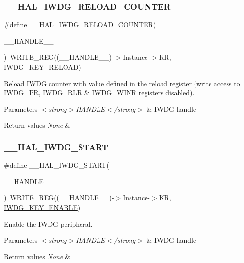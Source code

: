 \subsubsection{\texorpdfstring{\+\_\+\+\_\+\+H\+A\+L\+\_\+\+I\+W\+D\+G\+\_\+\+R\+E\+L\+O\+A\+D\+\_\+\+C\+O\+U\+N\+T\+ER}{\_\_HAL\_IWDG\_RELOAD\_COUNTER}}
{\footnotesize\ttfamily \#define \+\_\+\+\_\+\+H\+A\+L\+\_\+\+I\+W\+D\+G\+\_\+\+R\+E\+L\+O\+A\+D\+\_\+\+C\+O\+U\+N\+T\+ER(\begin{DoxyParamCaption}\item[{}]{\+\_\+\+\_\+\+H\+A\+N\+D\+L\+E\+\_\+\+\_\+ }\end{DoxyParamCaption})~W\+R\+I\+T\+E\+\_\+\+R\+EG((\+\_\+\+\_\+\+H\+A\+N\+D\+L\+E\+\_\+\+\_\+)-\/$>$Instance-\/$>$KR, \hyperlink{group___i_w_d_g___private___constants_ga33abf7b7c76dfda6b6380448a1d28966}{I\+W\+D\+G\+\_\+\+K\+E\+Y\+\_\+\+R\+E\+L\+O\+AD})}



Reload I\+W\+DG counter with value defined in the reload register (write access to I\+W\+D\+G\+\_\+\+PR, I\+W\+D\+G\+\_\+\+R\+LR \& I\+W\+D\+G\+\_\+\+W\+I\+NR registers disabled). 


\begin{DoxyParams}{Parameters}
{\em $<$strong$>$\+H\+A\+N\+D\+L\+E$<$/strong$>$} & I\+W\+DG handle \\
\hline
\end{DoxyParams}

\begin{DoxyRetVals}{Return values}
{\em None} & \\
\hline
\end{DoxyRetVals}
\mbox{\label{group___i_w_d_g___exported___macros_ga5914aff5b85e3151bb75377a32d83d6a}} 
\subsubsection{\texorpdfstring{\+\_\+\+\_\+\+H\+A\+L\+\_\+\+I\+W\+D\+G\+\_\+\+S\+T\+A\+RT}{\_\_HAL\_IWDG\_START}}
{\footnotesize\ttfamily \#define \+\_\+\+\_\+\+H\+A\+L\+\_\+\+I\+W\+D\+G\+\_\+\+S\+T\+A\+RT(\begin{DoxyParamCaption}\item[{}]{\+\_\+\+\_\+\+H\+A\+N\+D\+L\+E\+\_\+\+\_\+ }\end{DoxyParamCaption})~W\+R\+I\+T\+E\+\_\+\+R\+EG((\+\_\+\+\_\+\+H\+A\+N\+D\+L\+E\+\_\+\+\_\+)-\/$>$Instance-\/$>$KR, \hyperlink{group___i_w_d_g___private___constants_ga493295d56bb62752982234755612386f}{I\+W\+D\+G\+\_\+\+K\+E\+Y\+\_\+\+E\+N\+A\+B\+LE})}



Enable the I\+W\+DG peripheral. 


\begin{DoxyParams}{Parameters}
{\em $<$strong$>$\+H\+A\+N\+D\+L\+E$<$/strong$>$} & I\+W\+DG handle \\
\hline
\end{DoxyParams}

\begin{DoxyRetVals}{Return values}
{\em None} & \\
\hline
\end{DoxyRetVals}
